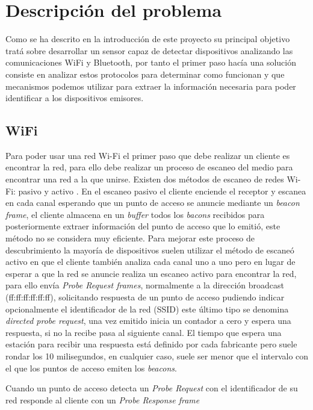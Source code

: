 \documentclass[../proyecto.tex]{subfiles}
\begin{document}
\chapter{Descripción del problema}

Como se ha descrito en la introducción de este proyecto su principal objetivo tratá sobre desarrollar un sensor capaz de detectar dispositivos analizando las comunicaciones WiFi y Bluetooth, por tanto el primer paso hacía una solución consiste en analizar estos protocolos para determinar como funcionan y que mecanismos podemos utilizar para extraer la información necesaria para poder identificar a los dispositivos emisores.

\section{WiFi}

Para poder usar una red Wi-Fi el primer paso que debe realizar un cliente es encontrar la red, para ello debe realizar un proceso de escaneo del medio para encontrar una red a la que unirse. Existen dos métodos de escaneo de redes Wi-Fi: pasivo y activo \cite{ieee80211_2016}. En el escaneo pasivo el cliente enciende el receptor y escanea en cada canal esperando que un punto de acceso se anuncie mediante un \textit{beacon frame}, el cliente almacena en un \textit{buffer} todos los \textit{bacons} recibidos para posteriormente extraer información del punto de acceso que lo emitió, este método no se considera muy eficiente. Para mejorar este proceso de descubrimiento la mayoría de dispositivos suelen utilizar el método de escaneó activo en que el cliente también analiza cada canal uno a uno pero en lugar de esperar a que la red se anuncie realiza un escaneo activo para encontrar la red, para ello envía \textit{Probe Request frames}, normalmente a la dirección broadcast (ff:ff:ff:ff:ff:ff), solicitando respuesta de un punto de acceso pudiendo indicar opcionalmente el identificador de la red (SSID) este último tipo se denomina \textit{directed probe request}, una vez emitido inicia un contador a cero y espera una respuesta, si no la recibe pasa al siguiente canal. El tiempo que espera una estación para recibir una respuesta está definido por cada fabricante pero suele rondar los 10 milisegundos, en cualquier caso, suele ser menor que el intervalo con el que los puntos de acceso emiten los \textit{beacons}.

Cuando un punto de acceso detecta un \textit{Probe Request} con el identificador de su red responde al cliente con un \textit{Probe Response frame}\\
\end{document}
